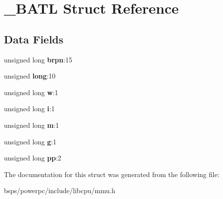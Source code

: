 \hypertarget{struct__BATL}{}\section{\+\_\+\+B\+A\+TL Struct Reference}
\label{struct__BATL}
\subsection*{Data Fields}
\begin{DoxyCompactItemize}
\item 
\mbox{\label{struct__BATL_a8fa3ddfe20e8221531c2aa6baae2d46f}} 
unsigned long {\bfseries brpn}\+:15
\item 
\mbox{\label{struct__BATL_a4d0f05c3aabcb19e6a71a05f08f8f530}} 
unsigned {\bfseries long}\+:10
\item 
\mbox{\label{struct__BATL_a79347c20a16314a0b26017ee743065b8}} 
unsigned long {\bfseries w}\+:1
\item 
\mbox{\label{struct__BATL_aa10551686c19767e474cd713448a21b8}} 
unsigned long {\bfseries i}\+:1
\item 
\mbox{\label{struct__BATL_a1192df46d382216b75b74282150e0dc5}} 
unsigned long {\bfseries m}\+:1
\item 
\mbox{\label{struct__BATL_a82aeea8cd628c25714fe872c7d70c26f}} 
unsigned long {\bfseries g}\+:1
\item 
\mbox{\label{struct__BATL_aec7463084e8082aa661668c404f21c39}} 
unsigned long {\bfseries pp}\+:2
\end{DoxyCompactItemize}


The documentation for this struct was generated from the following file\+:\begin{DoxyCompactItemize}
\item 
bsps/powerpc/include/libcpu/mmu.\+h\end{DoxyCompactItemize}
